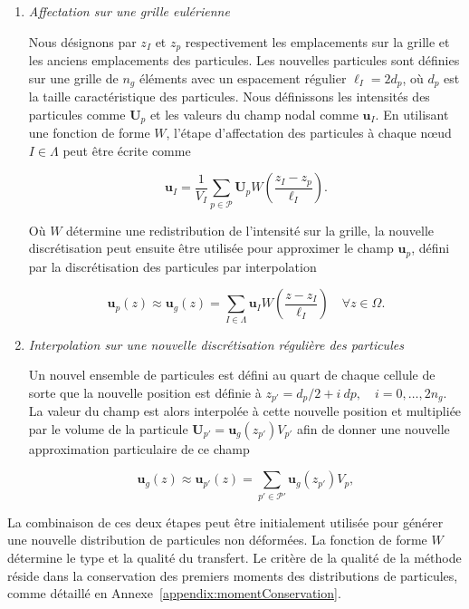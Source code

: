 \begin{enumerate}[label=(\alph*)]
    \item \textit{Affectation sur une grille eulérienne} \label{assigment}

          Nous désignons par $z_{I}$ et $z_{p}$ respectivement les emplacements sur la grille et les anciens emplacements des particules. Les nouvelles particules sont définies sur une grille de $n_g$ éléments avec un espacement régulier $\ell_I = 2 d_p$, où $d_p$ est la taille caractéristique des particules. Nous définissons les intensités des particules comme $\bm U_p$ et les valeurs du champ nodal comme $\bm u_I$. En utilisant une fonction de forme $W$, l'étape d'affectation des particules à chaque nœud $I \in \Lambda$ peut être écrite comme

          \[
              \bm{u}_I = \frac{1}{V_I} \sum_{p \in \mathcal{P}} \bm U_p  W \left(\frac{z_I - z_p}{\ell_I} \right).
          \]

          Où $W$ détermine une redistribution de l'intensité sur la grille, la nouvelle discrétisation peut ensuite être utilisée pour approximer le champ $\bm{u}_p$, défini par la discrétisation des particules par interpolation

          \[
              \bm{u}_p(z) \approx \bm{u}_g(z) = \sum_{I \in \Lambda} \bm u_I W \left(\frac{z - z_I}{\ell_I} \right) \quad \forall z \in \Omega.
          \]

    \item \textit{Interpolation sur une nouvelle discrétisation régulière des particules} \label{interpolation}

          Un nouvel ensemble de particules est défini au quart de chaque cellule de sorte que la nouvelle position est définie à $z_{p'} = d_p/2 + i~dp, \quad i = 0,\dots, 2n_g $. La valeur du champ est alors interpolée à cette nouvelle position et multipliée par le volume de la particule $\bm{U}_{p'} = \bm  u_g(z_{p'}) V_{p'}$ afin de donner une nouvelle approximation particulaire de ce champ

          \[
              \bm{u}_g(z)  \approx \bm{u}_{p'}(z) = \sum_{p'\in\mathcal{P'}} \bm{u}_g(z_{p'}) V_p,
          \]

\end{enumerate}

La combinaison de ces deux étapes peut être initialement utilisée pour générer une nouvelle distribution de particules non déformées. La fonction de forme $W$ détermine le type et la qualité du transfert. Le critère de la qualité de la méthode réside dans la conservation des premiers moments des distributions de particules, comme détaillé en Annexe~\ref{appendix:momentConservation}.

